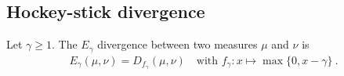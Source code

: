 \subsection{Hockey-stick divergence}

\begin{definition}
  \label{def:eGamma}
  Let $\gamma \ge 1$. The $E_\gamma$ divergence between two measures $\mu$ and $\nu$ is
  \begin{align*}
  E_\gamma(\mu, \nu) = D_{f_\gamma}(\mu, \nu) \quad \text{with } f_\gamma: x \mapsto \max\{0, x - \gamma\} \: .
  \end{align*}
\end{definition}